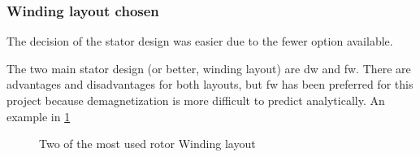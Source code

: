 \subsubsection{Winding layout chosen}
The decision of the stator design was easier due to the fewer option available.

The two main stator design (or better, winding layout) are \gls{dw} and \gls{fw}. There are advantages and disadvantages for both layouts, but \gls{fw} has been preferred for this project because demagnetization is more difficult to predict analytically. An example in \cref{fig:winding_placement}
\begin{figure}[H]
    \centering
  \caption{Two of the most used rotor Winding layout}
  \label{fig:winding_placement}
\end{figure}

